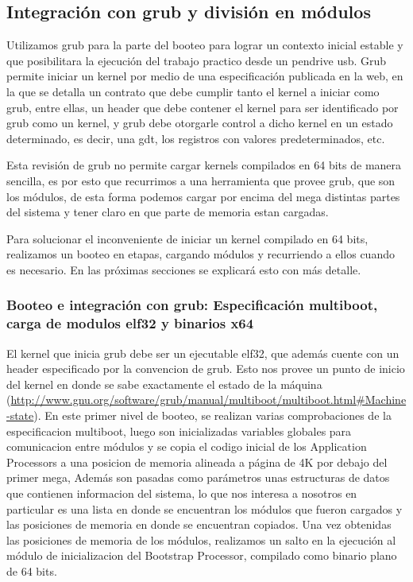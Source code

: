  \subsection{Integración con grub y división en módulos}
	Utilizamos grub para la parte del booteo para lograr un contexto inicial estable y que posibilitara la ejecución del trabajo practico desde un pendrive usb.
	Grub permite iniciar un kernel por medio de una especificación publicada en la web, en la que se detalla un contrato que debe cumplir tanto el kernel a iniciar como grub, entre ellas, un header que debe contener el kernel para ser identificado por grub como un kernel, y grub debe otorgarle control a dicho kernel en un estado determinado, es decir, una gdt, los registros con valores predeterminados, etc.

	Esta revisión de grub no permite cargar kernels compilados en 64 bits de manera sencilla, es por esto que recurrimos a una herramienta que provee grub, que son los módulos, de esta forma podemos cargar por encima del mega distintas partes del sistema y tener claro en que parte de memoria estan cargadas.

	Para solucionar el inconveniente de iniciar un kernel compilado en 64 bits, realizamos un booteo en etapas, cargando módulos y recurriendo a ellos cuando es necesario. En las próximas secciones se explicará esto con más detalle.

	\subsubsection{Booteo e integración con grub: Especificación multiboot, carga de modulos elf32 y binarios x64}
		El kernel que inicia grub debe ser un ejecutable elf32, que además cuente con un header especificado por la convencion de grub. Esto nos provee un punto de inicio del kernel en donde se sabe exactamente el estado de la máquina (\url{http://www.gnu.org/software/grub/manual/multiboot/multiboot.html#Machine-state}).
		En este primer nivel de booteo, se realizan varias comprobaciones de la especificacion multiboot, luego son inicializadas variables globales para comunicacion entre módulos y se copia el codigo inicial de los Application Processors a una posicion de memoria alineada a página de 4K por debajo del primer mega, Además son pasadas como parámetros unas estructuras de datos que contienen informacion del sistema, lo que nos interesa a nosotros en particular es una lista en donde se encuentran los módulos que fueron cargados y las posiciones de memoria en donde se encuentran copiados. Una vez obtenidas las posiciones de memoria de los módulos, realizamos un salto en la ejecución al módulo de inicializacion del Bootstrap Processor, compilado como binario plano de 64 bits.

